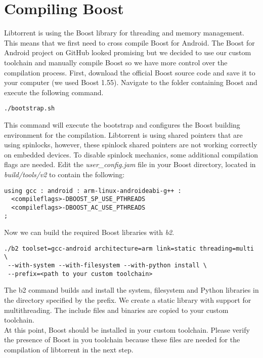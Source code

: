 \section{Compiling Boost}
	Libtorrent is using the Boost library for threading and memory management. This means that we first need to cross compile Boost for Android. The Boost for Android project on GitHub looked promising but we decided to use our custom toolchain and manually compile Boost so we have more control over the compilation process. First, download the official Boost source code and save it to your computer (we used Boost 1.55). Navigate to the folder containing Boost and execute the following command.
	\begin{lstlisting}
./bootstrap.sh
	\end{lstlisting}
	This command will execute the bootstrap and configures the Boost building environment for the compilation. Libtorrent is using shared pointers that are using spinlocks, however, these spinlock shared pointers are not working correctly on embedded devices. To disable spinlock mechanics, some additional compilation flags are needed. Edit the \emph{user\_config.jam} file in your Boost directory, located in \emph{build/tools/v2} to contain the following:
	\begin{lstlisting}
using gcc : android : arm-linux-androideabi-g++ : 
  <compileflags>-DBOOST_SP_USE_PTHREADS 
  <compileflags>-DBOOST_AC_USE_PTHREADS
;
	\end{lstlisting}
	Now we can build the required Boost libraries with \emph{b2}.
	\begin{lstlisting}
./b2 toolset=gcc-android architecture=arm link=static threading=multi \
 --with-system --with-filesystem --with-python install \
 --prefix=<path to your custom toolchain>
	\end{lstlisting}
	The b2 command builds and install the system, filesystem and Python libraries in the directory specified by the prefix. We create a static library with support for multithreading. The include files and binaries are copied to your custom toolchain.\\
	At this point, Boost should be installed in your custom toolchain. Please verify the presence of Boost in you toolchain because these files are needed for the compilation of libtorrent in the next step.